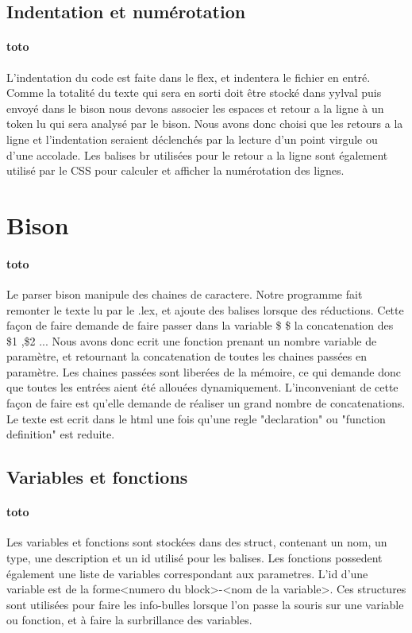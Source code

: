 \documentclass{report}
\begin{document}
{		\subsection{Indentation et numérotation}{
		\paragraph{toto}{
			L'indentation du code est faite dans le flex, et indentera le fichier en entré. Comme la totalité du texte qui sera en sorti doit être stocké dans yylval puis envoyé dans le bison
			nous devons associer les espaces et retour a la ligne à un token lu qui sera analysé par le bison. Nous avons donc choisi que les retours a la ligne et l'indentation seraient 
			déclenchés par la lecture d'un point virgule ou d'une accolade. Les balises br utilisées pour le retour a la ligne sont également utilisé par le CSS pour calculer et afficher la numérotation des lignes.
			}
		}
		\section{Bison}{
		\paragraph{toto}{
		 Le parser bison manipule des chaines de caractere. Notre programme fait remonter le texte lu par le .lex, et ajoute des balises lorsque des réductions. Cette façon de faire demande de 
		 faire passer dans la variable \$ \$ la concatenation des \$1 ,\$2 ... Nous avons donc ecrit une fonction prenant un nombre variable de paramètre, et retournant la concatenation de toutes
		 les chaines passées en paramètre. Les chaines passées sont liberées de la mémoire, ce qui demande donc que toutes les entrées aient été allouées dynamiquement.
		 L'inconveniant de cette façon de faire est qu'elle demande de réaliser un grand nombre de concatenations.
		 Le texte est ecrit dans le html une fois qu'une regle "declaration" ou "function definition" est reduite.
			}
			\subsection{Variables et fonctions}{
			\paragraph{toto}{
			Les variables et fonctions sont stockées dans des struct, contenant un nom, un type, une description et un id utilisé pour les balises. Les fonctions possedent également une liste 
			de variables correspondant aux parametres. L'id d'une variable est de la forme<numero du block>-<nom de la variable>.
			Ces structures sont utilisées pour faire les info-bulles lorsque l'on passe la souris sur une variable ou fonction, et à faire la surbrillance des variables.
			
}}}}
\end{document}
